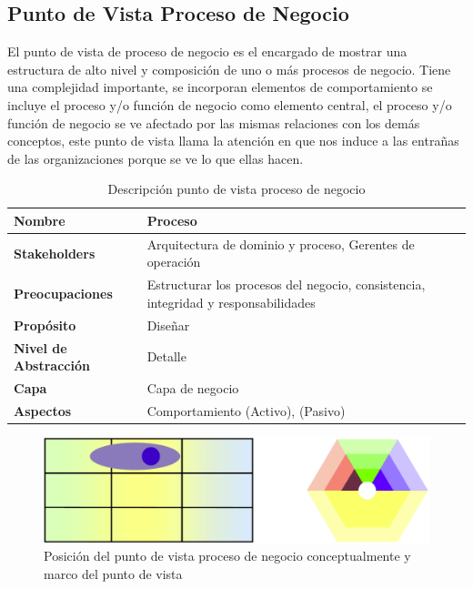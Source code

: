     \subsection{Punto de Vista Proceso de Negocio}
    El punto de vista de proceso de negocio es el encargado de mostrar una estructura de alto nivel y composición de uno o más procesos de negocio. Tiene una complejidad   importante, se incorporan elementos de comportamiento se incluye el proceso y/o función de negocio como elemento central, el proceso y/o función de negocio se ve afectado por  las mismas relaciones con los demás conceptos, este punto de vista llama la atención en que nos induce a las entrañas de las organizaciones porque se ve lo que ellas hacen.  \cite{ref9}
    \begin{table}[h]
      \centering
      \begin{tabular}{p{3.7cm}p{8cm}}
        \hline
        \textbf{Nombre} & \textbf{Proceso} \\
        \hline
        \textbf{Stakeholders} & Arquitectura de dominio y proceso, Gerentes de operación \\
        \textbf{Preocupaciones} & Estructurar los procesos del negocio, consistencia, integridad y responsabilidades \\
        \textbf{Propósito} & Diseñar \\
        \textbf{Nivel de Abstracción} & Detalle \\
        \textbf{Capa} & Capa de negocio \\
        \textbf{Aspectos} & Comportamiento (Activo), (Pasivo) \\
      \end{tabular}
      \caption{Descripción punto de vista proceso de negocio \cite{ref9}}
      \label{Tab:tabla7}
    \end{table}
    \begin{figure}[h]
      \centering
      \includegraphics[scale=0.2]{Imagenes/Figuras/17}
      \caption{Posición del punto de vista proceso de negocio conceptualmente y marco del punto de vista \cite{ref9}}
      \label{figura17}
    \end{figure}
